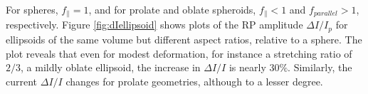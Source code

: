 		
		For spheres, $f_{\parallel}=1$, and for prolate and oblate spheroids, $f_{\parallel}<1$ and $f_{parallel}>1$, respectively. Figure \ref{fig:dIellipsoid} shows plots of the RP amplitude $\Delta I/I_{p}$ for ellipsoids of the same volume but different aspect ratios, relative to a sphere. The plot reveals that even for modest deformation, for instance a stretching ratio of $2/3$, a mildly oblate ellipsoid, the increase in $\Delta I/I$ is nearly $30\%$. Similarly, the current $\Delta I/I$ changes for prolate geometries, although to a lesser degree.

		
		


